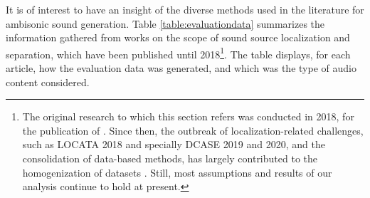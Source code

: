 It is of interest to have an insight of the diverse methods used in the literature for ambisonic sound generation. Table \ref{table:evaluationdata} summarizes the information gathered from works on the scope of sound source localization and separation, which have been published until 
2018\footnote{The original research to which this section refers was conducted in 2018, for the publication of \cite{perez2018ambiscaper}. Since then, the outbreak of localization-related challenges, such as LOCATA 2018 and specially DCASE 2019 and 2020, and the consolidation of data-based methods, has largely contributed to the homogenization of datasets \cite{evers2020locata, adavanne2019multi, politis2020dataset}. Still, most assumptions and results of our analysis continue to hold at present.}.
 The table displays, for each article, how the evaluation data was generated, and which was the type of audio content considered.
 


